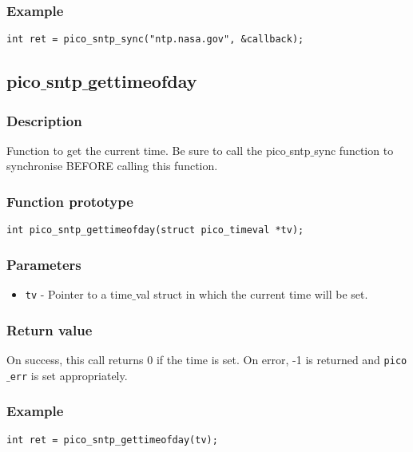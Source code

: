 \subsubsection*{Example}
\begin{verbatim}
int ret = pico_sntp_sync("ntp.nasa.gov", &callback);
\end{verbatim}



\subsection{pico$\_$sntp$\_$gettimeofday}

\subsubsection*{Description}
Function to get the current time. Be sure to call the pico$\_$sntp$\_$sync function to synchronise BEFORE calling this function.

\subsubsection*{Function prototype}
\begin{verbatim}
int pico_sntp_gettimeofday(struct pico_timeval *tv);
\end{verbatim}

\subsubsection*{Parameters}
\begin{itemize}[noitemsep]
\item \texttt{tv} - Pointer to a time$\_$val struct in which the current time will be set.
\end{itemize}

\subsubsection*{Return value}
On success, this call returns 0 if the time is set.
On error, -1 is returned and \texttt{pico$\_$err} is set appropriately.

\subsubsection*{Example}
\begin{verbatim}
int ret = pico_sntp_gettimeofday(tv);
\end{verbatim}



